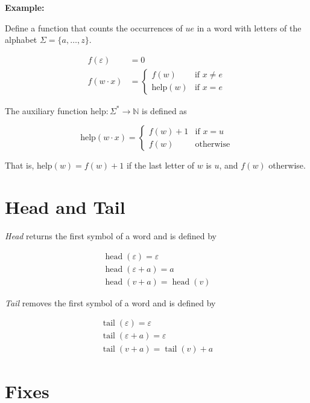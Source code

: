 \textbf{Example:}

Define a function that counts the occurrences of \(ue\) in a word with letters of the alphabet 
\(\Sigma = \{a, \dots, z\}\).

\begin{align*}
    f(\varepsilon) &= 0 \\
    f(w \cdot x) &=
    \begin{cases}
        f(w) & \text{if } x \ne e \\
        \text{help}(w) & \text{if } x = e
    \end{cases}
\end{align*}

The auxiliary function \( \text{help}: \Sigma^* \to \mathbb{N} \) is defined as

\[
    \text{help}(w \cdot x) =
    \begin{cases}
        f(w) + 1 & \text{if } x = u \\
        f(w)     & \text{otherwise}
    \end{cases}
\]

That is, \( \text{help}(w) = f(w) + 1 \) if the last letter of \( w \) is \( u \), and \( f(w) \) otherwise.

\section{Head and Tail}

\emph{Head} returns the first symbol of a word and is defined by 

\begin{align*}
    \operatorname{head}(\varepsilon) = \varepsilon \\ 
    \operatorname{head}(\varepsilon + a) = a \\ 
    \operatorname{head}(v + a) = \operatorname{head}(v) 
\end{align*}

\emph{Tail} removes the first symbol of a word and is defined by 

\begin{align*}
    \operatorname{tail}(\varepsilon) = \varepsilon \\ 
    \operatorname{tail}(\varepsilon + a) = \varepsilon \\ 
    \operatorname{tail}(v + a) = \operatorname{tail}(v) + a  
\end{align*}

\section{Fixes}

